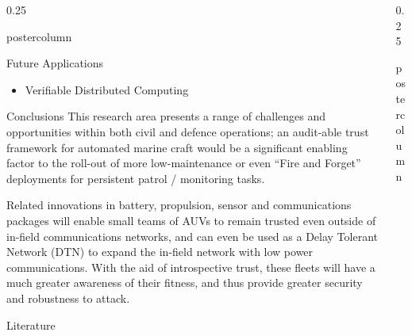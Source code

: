 \documentclass[final,hyperref={pdfpagelabels=false}]{beamer}
\def\colwidth{0.25\linewidth}
\begin{document}
\begin{frame}[fragile]
\begin{columns}[t]
\begin{column}{\colwidth}
\begin{beamercolorbox}[center,wd=\textwidth]{postercolumn}
\begin{minipage}[T]{.98\textwidth}
{\begin{block}{Future Applications}
\begin{itemize}
\begin{itemize}
                  \item Verifiable Distributed Computing
                \end{itemize}
              \end{itemize}              
            \end{block}
            \begin{block}{Conclusions}
              This research area presents a range of challenges and opportunities within both civil and defence operations; an audit-able trust framework for automated marine craft would be a significant enabling factor to the roll-out of more low-maintenance or even ``Fire and Forget'' deployments for persistent patrol / monitoring tasks. 

              \vspace{\baselineskip}

              Related innovations in battery, propulsion, sensor and communications packages will enable small teams of AUVs to remain trusted even outside of in-field communications networks, and can even be used as a Delay Tolerant Network (DTN) to expand the in-field network with low power communications. With the aid of introspective trust, these fleets will have a much greater awareness of their fitness, and thus provide greater security and robustness to attack.

            \end{block}
            \begin{block}{Literature} 
           {\small           
            \printbibliography

           } 
         \end{block} 
          }
        \end{minipage}
      \end{beamercolorbox}
    \end{column}
\iffalse
    \begin{column}{\colwidth}
      \begin{beamercolorbox}[center,wd=\textwidth]{postercolumn}
        \begin{minipage}[T]{.98\textwidth} %
         

\end{minipage}
\end{beamercolorbox}
\end{column}
\end{columns}
\end{frame}
\end{document}
